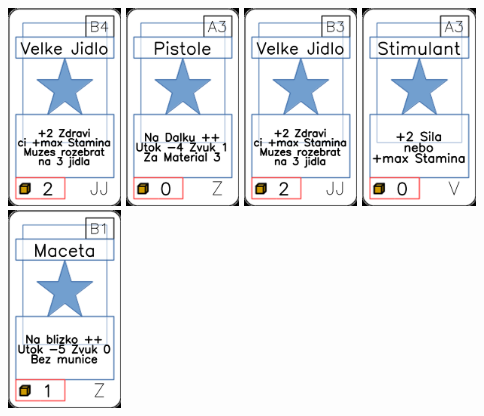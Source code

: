 \documentclass[a4paper]{article}
\begin{document}
	\includegraphics[width=3.0cm]{img-1_38}
	\includegraphics[width=3.0cm]{img-1_92}
	\includegraphics[width=3.0cm]{img-1_37}
	\includegraphics[width=3.0cm]{img-1_62}
	\includegraphics[width=3.0cm]{img-1_95}
\end{document}
